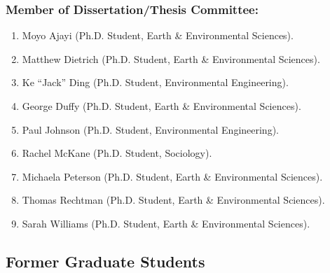 \documentclass[10pt]{article}
\begin{document}
    \subsubsection{Member of Dissertation/Thesis Committee:}
    \begin{enumerate}
    \item Moyo Ajayi (Ph.D. Student, Earth \& Environmental Sciences).
    \item Matthew Dietrich (Ph.D. Student, Earth \& Environmental Sciences).
    \item Ke ``Jack'' Ding (Ph.D. Student, Environmental Engineering).
    \item George Duffy (Ph.D. Student, Earth \& Environmental Sciences).
    \item Paul Johnson (Ph.D. Student, Environmental Engineering).
    \item Rachel McKane (Ph.D. Student, Sociology).
    \item Michaela Peterson (Ph.D. Student, Earth \& Environmental Sciences).
    \item Thomas Rechtman (Ph.D. Student, Earth \& Environmental Sciences).
    \item Sarah Williams (Ph.D. Student, Earth \& Environmental Sciences).
    \end{enumerate}
    \subsection{Former Graduate Students}
\end{document}
